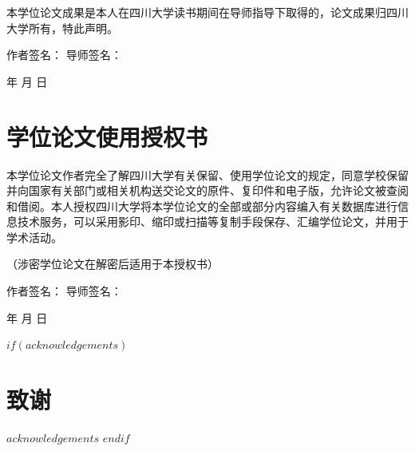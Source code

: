 \documentclass[UTF8,zihao=-4,linespread=1.0,twoside,scheme=chinese]{ctexbook}
\begin{document}
本学位论文成果是本人在四川大学读书期间在导师指导下取得的，论文成果归四川大学所有，特此声明。

\vspace{20pt}
\noindent 作者签名：\hspace{5em} \hfill 导师签名：\hspace{5em}

\vspace{20pt}
\noindent \hspace{8em} 年 \hspace{2em} 月 \hspace{2em} 日

\vspace{40pt}
\chapter*{学位论文使用授权书}

本学位论文作者完全了解四川大学有关保留、使用学位论文的规定，同意学校保留并向国家有关部门或相关机构送交论文的原件、复印件和电子版，允许论文被查阅和借阅。本人授权四川大学将本学位论文的全部或部分内容编入有关数据库进行信息技术服务，可以采用影印、缩印或扫描等复制手段保存、汇编学位论文，并用于学术活动。

（涉密学位论文在解密后适用于本授权书）

\vspace{20pt}
\noindent 作者签名：\hspace{5em} \hfill 导师签名：\hspace{5em}

\vspace{20pt}
\noindent \hspace{8em} 年 \hspace{2em} 月 \hspace{2em} 日

$if(acknowledgements)$
\clearpage
\chapter*{致谢}
$acknowledgements$
$endif$
\end{document}
